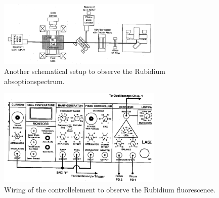 \begin{figure}
  \centering
  \includegraphics[width=0.7\textwidth]{setup3.png}
  \caption{Another schematical setup to observe the Rubidium absoptionspectrum.\cite{V61}}
  \label{fig:setup3}
\end{figure}


\begin{figure}
  \centering
  \includegraphics[width=0.7\textwidth]{wiring2.png}
  \caption{Wiring of the controllelement to observe the Rubidium fluorescence.\cite{V61}}
  \label{fig:dl_controll2}
\end{figure}
